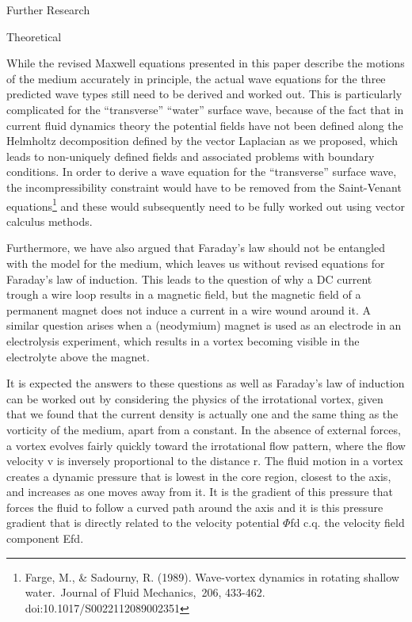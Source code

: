 \documentclass{article}
\begin{document}
Further Research

Theoretical

While the revised Maxwell equations presented in this paper describe the motions of the medium accurately in principle,
the actual wave equations for the three predicted wave types still need to be derived and worked out. This is
particularly complicated for the ``transverse'' ``water'' surface wave, because of the fact that in current fluid
dynamics theory the potential fields have not been defined along the Helmholtz decomposition defined by the vector
Laplacian as we proposed, which leads to non-uniquely defined fields and associated problems with boundary conditions.
In order to derive a wave equation for the ``transverse'' surface wave, the incompressibility constraint would have to
be removed from the Saint-Venant equations\footnote{ Farge, M., \& Sadourny, R. (1989). Wave-vortex dynamics in
rotating shallow water.~Journal of Fluid Mechanics,~206, 433-462. doi:10.1017/S0022112089002351 \par } and these would
subsequently need to be fully worked out using vector calculus methods. 

Furthermore, we have also argued that Faraday's law should not be entangled with the model for the medium, which leaves
us without revised equations for Faraday's law of induction. This leads to the question of why a DC current trough a
wire loop results in a magnetic field, but the magnetic field of a permanent magnet does not induce a current in a wire
wound around it. A similar question arises when a (neodymium) magnet is used as an electrode in an electrolysis
experiment, which results in a vortex becoming visible in the electrolyte above the magnet.

It is expected the answers to these questions as well as Faraday's law of induction can be worked out by considering the
physics of the irrotational vortex, given that we found that the current density is actually one and the same thing as
the vorticity of the medium, apart from a constant. In the absence of external forces, a vortex evolves fairly quickly
toward the irrotational flow pattern, where the flow velocity v is inversely proportional to the distance r. The fluid
motion in a vortex creates a dynamic pressure that is lowest in the core region, closest to the axis, and increases as
one moves away from it. It is the gradient of this pressure that forces the fluid to follow a curved path around the
axis and it is this pressure gradient that is directly related to the velocity potential $\Phi $fd c.q. the velocity
field component Efd.
\end{document}

